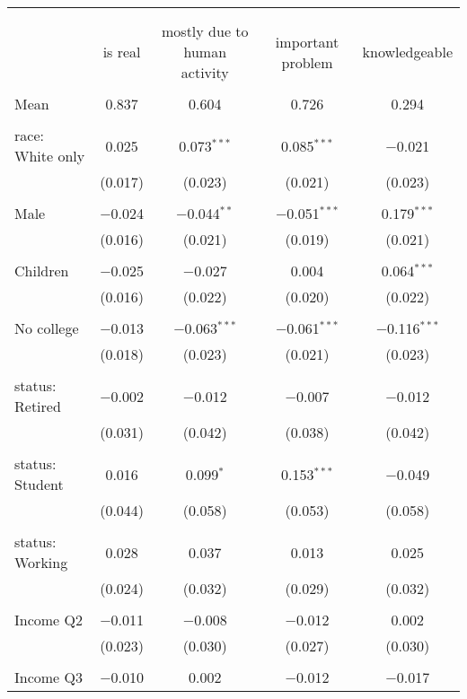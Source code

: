 
\begin{tabular}{@{\extracolsep{5pt}}lcccc} 
\\[-1.8ex]\hline 
\hline \\[-1.8ex] 
\\[-1.8ex] & is real & mostly due to human activity & important problem & knowledgeable \\ 
\hline \\[-1.8ex] 
 Mean & 0.837 & 0.604 & 0.726 & 0.294  \\ \hline \\[-1.8ex] race: White only & 0.025 & 0.073$^{***}$ & 0.085$^{***}$ & $-$0.021 \\ 
  & (0.017) & (0.023) & (0.021) & (0.023) \\ 
  & & & & \\ 
 Male & $-$0.024 & $-$0.044$^{**}$ & $-$0.051$^{***}$ & 0.179$^{***}$ \\ 
  & (0.016) & (0.021) & (0.019) & (0.021) \\ 
  & & & & \\ 
 Children & $-$0.025 & $-$0.027 & 0.004 & 0.064$^{***}$ \\ 
  & (0.016) & (0.022) & (0.020) & (0.022) \\ 
  & & & & \\ 
 No college & $-$0.013 & $-$0.063$^{***}$ & $-$0.061$^{***}$ & $-$0.116$^{***}$ \\ 
  & (0.018) & (0.023) & (0.021) & (0.023) \\ 
  & & & & \\ 
 status: Retired & $-$0.002 & $-$0.012 & $-$0.007 & $-$0.012 \\ 
  & (0.031) & (0.042) & (0.038) & (0.042) \\ 
  & & & & \\ 
 status: Student & 0.016 & 0.099$^{*}$ & 0.153$^{***}$ & $-$0.049 \\ 
  & (0.044) & (0.058) & (0.053) & (0.058) \\ 
  & & & & \\ 
 status: Working & 0.028 & 0.037 & 0.013 & 0.025 \\ 
  & (0.024) & (0.032) & (0.029) & (0.032) \\ 
  & & & & \\ 
 Income Q2 & $-$0.011 & $-$0.008 & $-$0.012 & 0.002 \\ 
  & (0.023) & (0.030) & (0.027) & (0.030) \\ 
  & & & & \\ 
 Income Q3 & $-$0.010 & 0.002 & $-$0.012 & $-$0.017 \\ 

\end{tabular}
